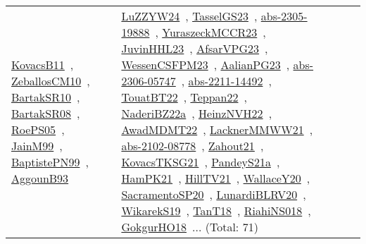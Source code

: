 {\begin{longtable}{lp{3cm}>{\raggedright\arraybackslash}p{6cm}>{\raggedright\arraybackslash}p{6cm}>{\raggedright\arraybackslash}p{8cm}}
\href{../works/KovacsB11.pdf}{KovacsB11}~\cite{KovacsB11}, \href{../works/ZeballosCM10.pdf}{ZeballosCM10}~\cite{ZeballosCM10}, \href{../works/BartakSR10.pdf}{BartakSR10}~\cite{BartakSR10}, \href{../works/BartakSR08.pdf}{BartakSR08}~\cite{BartakSR08}, \href{../works/RoePS05.pdf}{RoePS05}~\cite{RoePS05}, \href{../works/JainM99.pdf}{JainM99}~\cite{JainM99}, \href{../works/BaptistePN99.pdf}{BaptistePN99}~\cite{BaptistePN99}, \href{../works/AggounB93.pdf}{AggounB93}~\cite{AggounB93} & \href{../works/LuZZYW24.pdf}{LuZZYW24}~\cite{LuZZYW24}, \href{../works/TasselGS23.pdf}{TasselGS23}~\cite{TasselGS23}, \href{../works/abs-2305-19888.pdf}{abs-2305-19888}~\cite{abs-2305-19888}, \href{../works/YuraszeckMCCR23.pdf}{YuraszeckMCCR23}~\cite{YuraszeckMCCR23}, \href{../works/JuvinHHL23.pdf}{JuvinHHL23}~\cite{JuvinHHL23}, \href{../works/AfsarVPG23.pdf}{AfsarVPG23}~\cite{AfsarVPG23}, \href{../works/WessenCSFPM23.pdf}{WessenCSFPM23}~\cite{WessenCSFPM23}, \href{../works/AalianPG23.pdf}{AalianPG23}~\cite{AalianPG23}, \href{../works/abs-2306-05747.pdf}{abs-2306-05747}~\cite{abs-2306-05747}, \href{../works/abs-2211-14492.pdf}{abs-2211-14492}~\cite{abs-2211-14492}, \href{../works/TouatBT22.pdf}{TouatBT22}~\cite{TouatBT22}, \href{../works/Teppan22.pdf}{Teppan22}~\cite{Teppan22}, \href{../works/NaderiBZ22a.pdf}{NaderiBZ22a}~\cite{NaderiBZ22a}, \href{../works/HeinzNVH22.pdf}{HeinzNVH22}~\cite{HeinzNVH22}, \href{../works/AwadMDMT22.pdf}{AwadMDMT22}~\cite{AwadMDMT22}, \href{../works/LacknerMMWW21.pdf}{LacknerMMWW21}~\cite{LacknerMMWW21}, \href{../works/abs-2102-08778.pdf}{abs-2102-08778}~\cite{abs-2102-08778}, \href{../works/Zahout21.pdf}{Zahout21}~\cite{Zahout21}, \href{../works/KovacsTKSG21.pdf}{KovacsTKSG21}~\cite{KovacsTKSG21}, \href{../works/PandeyS21a.pdf}{PandeyS21a}~\cite{PandeyS21a}, \href{../works/HamPK21.pdf}{HamPK21}~\cite{HamPK21}, \href{../works/HillTV21.pdf}{HillTV21}~\cite{HillTV21}, \href{../works/WallaceY20.pdf}{WallaceY20}~\cite{WallaceY20}, \href{../works/SacramentoSP20.pdf}{SacramentoSP20}~\cite{SacramentoSP20}, \href{../works/LunardiBLRV20.pdf}{LunardiBLRV20}~\cite{LunardiBLRV20}, \href{../works/WikarekS19.pdf}{WikarekS19}~\cite{WikarekS19}, \href{../works/TanT18.pdf}{TanT18}~\cite{TanT18}, \href{../works/RiahiNS018.pdf}{RiahiNS018}~\cite{RiahiNS018}, \href{../works/GokgurHO18.pdf}{GokgurHO18}~\cite{GokgurHO18}... (Total: 71)\\

\end{longtable}}
